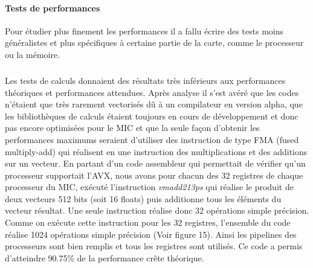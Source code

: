 \documentclass{article}
\begin{document}
				\paragraph{Tests de performances}
				Pour étudier plus finement les performances il a fallu écrire des tests moins généralistes et plus spécifiques
				à certaine partie de la carte, comme le processeur ou la mémoire.
					\subparagraph{}
					Les tests de calculs donnaient des résultats très inférieurs aux performances théoriques et performances 
					attendues. Après analyse il s'est avéré que les codes n'étaient que très rarement vectorisés dû à un compilateur 
					en version alpha, que les bibliothèques de calculs étaient toujours en cours de développement et donc pas 
					encore optimisées pour le MIC et que la seule façon d'obtenir les performances maximums seraient d'utiliser
					des instruction de type FMA (fused multiply-add) qui réalisent en une instruction des multiplications et 
					des additions sur un vecteur. \newline
					En partant d'un code assembleur qui permettait de vérifier qu'un processeur supportait l'AVX, nous avons 
					pour chacun des 32 registres de chaque processeur du MIC, exécuté l'instruction \emph{vmadd213ps} qui réalise le 
					produit de deux vecteurs 512 bits (soit 16 floats) puis additionne tous les éléments du vecteur résultat.
					Une seule instruction réalise donc 32 opérations simple précision.
					Comme on exécute cette instruction pour les 32 registres, l'ensemble du code réalise 1024 opérations simple
					précision (Voir figure 15). Ainsi les pipelines des processeurs sont bien remplis et tous les registres sont
					utilisés. Ce code a permis d'atteindre 90.75\% de la performance crête théorique.
\end{document}
